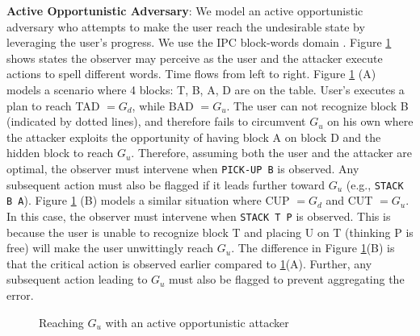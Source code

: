 \textbf{Active Opportunistic Adversary}: 
We model an active opportunistic adversary who attempts to make the user reach the undesirable state by leveraging the user's progress. We use the IPC block-words domain  \cite{gupta1992bw}. Figure \ref{fig:multi} shows states the observer may perceive as the user and the attacker execute actions to spell different words. Time flows from left to right. Figure \ref{fig:multi} (A) models a  scenario where 4 blocks: T, B, A, D are on the table. User's executes a plan to reach  TAD $ =G_d$, while BAD $ =G_u$. The user can not recognize block B (indicated by dotted lines), and therefore fails to circumvent $G_u$ on his own where the attacker exploits the opportunity of having block A on block D and the hidden block to reach $G_u$. Therefore, assuming both the user and the attacker are optimal, the observer must intervene when \texttt{PICK-UP B} is observed. Any subsequent action must also be flagged if it leads further toward $G_u$ (e.g., \texttt{STACK B A}). Figure \ref{fig:multi} (B) models a similar situation where CUP $ =G_d$ and CUT $ =G_u$. In this case, the observer must intervene when \texttt{STACK T P} is observed. This is because the user is unable to recognize block T and placing U on T (thinking P is free) will make the user unwittingly reach $G_u$. The difference in Figure \ref{fig:multi}(B) is that the critical action is observed earlier compared to \ref{fig:multi}(A). Further, any subsequent action leading  to $G_u$ must also be flagged to prevent aggregating the error.
\begin{figure}[ht]
        \caption{Reaching $G_u$ with an active opportunistic attacker}
        \label{fig:multi}
\end{figure}


